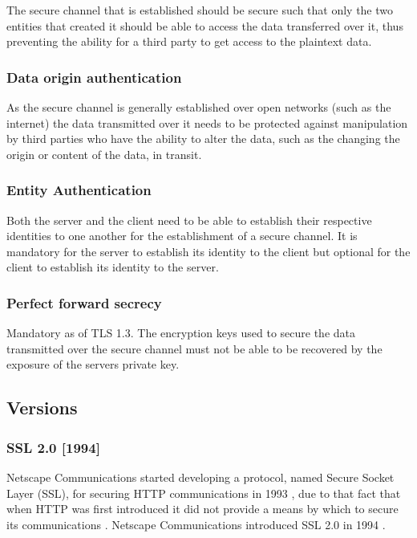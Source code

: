\documentclass{mscreport}
\begin{document}
The secure channel that is established should be secure such that only the two entities that created it should be able to access the data transferred over it, thus preventing the ability for a third party to get access to the plaintext data.

\subsubsection{Data origin authentication}

As the secure channel is generally established over open networks (such as the internet) the data transmitted over it needs to be protected against manipulation by third parties who have the ability to alter the data, such as the changing the origin or content of the data, in transit.

\subsubsection{Entity Authentication}

Both the server and the client need to be able to establish their respective identities to one another for the establishment of a secure channel. It is mandatory for the server to establish its identity to the client but optional for the client to establish its identity to the server.

\subsubsection{Perfect forward secrecy}

Mandatory as of TLS 1.3. The encryption keys used to secure the data transmitted over the secure channel must not be able to be recovered by the exposure of the servers private key.

\subsection{Versions}

\subsubsection{SSL 2.0 [1994]}

Netscape Communications started developing a protocol, named Secure Socket Layer (SSL), for securing HTTP communications in 1993 \cite{Oppliger2016-ig}, due to that fact that when HTTP was first introduced it did not provide a means by which to secure its communications \cite{Oppliger2016-ig}.
Netscape Communications introduced SSL 2.0 in 1994 \cite{Oppliger2016-ig,Wu2016-nx}.
\end{document}
